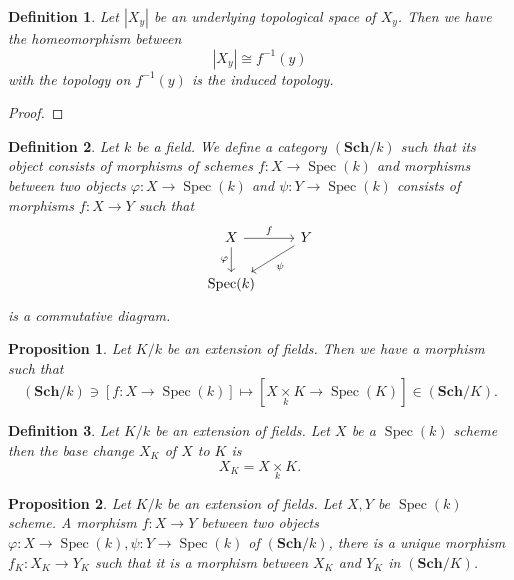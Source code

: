 \documentclass{article}
\newtheorem{proposition}{Proposition}[section]
\newtheorem{definition}{Definition}[section]
\numberwithin{equation}{section}
\DeclareMathOperator{\Spec}{Spec}
\newcommand{\fib}[1]{%
  \mathbin{\mathop{\times}\limits_{#1}}%
}
\begin{document}
\begin{definition}
Let $|X_y|$ be an underlying topological space of $X_y$. Then we have the homeomorphism between
\begin{equation*}
|X_y|\cong f^{-1}(y)
\end{equation*}
with the topology on $f^{-1}(y)$ is the induced topology. %
\end{definition}

\begin{proof}
\end{proof}

\begin{definition}
Let $k$ be a field. We define a category $(\mathbf{Sch}/k)$ such that its object consists of morphisms of schemes $f:X\to\Spec(k)$ and morphisms between two objects $\varphi:X\to\Spec(k)$ and $\psi:Y\to\Spec(k)$ consists of morphisms $f:X\to Y$ such that 
\[
\begin{tikzcd}
X \arrow[d, "\varphi"'] \arrow[r, "f"] & Y \arrow[ld, "\psi"] \\
\Spec(k)                               &                  
\end{tikzcd}
\]
is a commutative diagram.
\end{definition}

\begin{proposition}
Let $K/k$ be an extension of fields. Then we have a morphism such that 
\begin{equation*}
(\mathbf{Sch}/k)\ni [f:X\to\Spec(k)]\mapsto [X\fib{k}K\to\Spec(K)]\in(\mathbf{Sch}/K).
\end{equation*}
\label{base_change_field_extension}
\end{proposition}

\begin{definition}
Let $K/k$ be an extension of fields. Let $X$ be a $\Spec(k)$ scheme then the base change $X_K$ of $X$ to $K$ is 
\begin{equation*}
X_K = X\fib{k}K.
\end{equation*} 
\end{definition}

\begin{proposition}
Let $K/k$ be an extension of fields. Let $X,Y$ be $\Spec(k)$ scheme. A morphism $f:X\to Y$ between two objects $\varphi:X\to\Spec(k),\psi:Y\to\Spec(k)$ of $(\mathbf{Sch}/k)$, there is a unique morphism $f_K:X_K\to Y_K$ such that it is a morphism between $X_K$ and $Y_K$ in $(\mathbf{Sch}/K)$.
\end{proposition}
\end{document}
